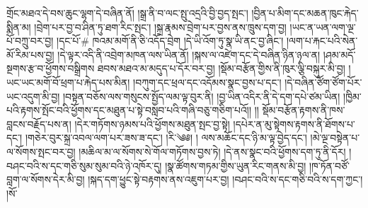  གྲོང་མཐའ་དེ་བས་ཆུང་ལྷག་དེ་བཞིན་ནོ། །སྒྲ་ནི་བ་ལང་སྤུ་འདྲའི་བྱི་བྱད་སྤང་། །བྱིན་པ་མིག་དང་མཆན་ཁུང་རྐེད་སྨིན་མ། །བྲེག་པར་བྱ་བ་ཤིན་ཏུ་ཐག་རིང་སྤང་། །སྐྲ་རྣམས་བྲེག་པར་བྱས་ནས་ཁྲུས་དག་བྱ། །ཡང་ན་ཡན་ལག་ལྔ་པོ་བཀྲུ་བར་བྱ། །དང་པོ་# ཁའམ་མགོ་ནི་ཅི་འདོད་བྲེག །དེ་ཡི་འོག་ཏུ་སྣ་ཡི་ནང་བྱ་ཞིང་། །ལག་པ་རྐང་པའི་སེན་མོ་རིམ་པས་བྱ། །དེ་ལྟར་འདི་ནི་འབྲེག་མཁན་ལས་ཡིན་ནོ། །སྐས་ལ་འཛེག་དང་དེ་བཞིན་ཉིན་ཉལ་ན། །ཤམ་མདོ་སྔགས་རྩ་བ་ཕྱོགས་བསྒྲིགས ཐབས་མཐའ་མ་མདུད་པ་དོར་བར་བྱ། །སྡོམ་བརྩོན་གྱིས་ནི་ཁུར་ལྕི་བསྐུར་མི་བྱ། །ཡང་ཡང་མགོ་བོ་ཕྲག་པ་རྐེད་པས་མིན། །བཀུག་དང་ཕྲལ་དང་འདོམས་སྣང་བྱས་པ་དང་། །དེ་བཞིན་ཙོག་ཙོག་པོར་ཡང་འདུག་མི་བྱ། །བསྟན་བཅོས་ལས་གསུངས་སྤྱོད་ལམ་ལྟ་བུར་ནི། །བྱ་ཡིན་འདིར་ནི་དེ་དག་དཔེ་ཙམ་ཡིན། །ཁྱིམ་པའི་རྟགས་སྤོང་བའི་ཕྱོགས་དང་མཐུན་པ་སྟེ་བསླབ་པའི་གཞི་བཅུ་གཅིག་པའོ།། །། སྡོམ་བརྩོན་རྟགས་ནི་ཁས་བླངས་བརྗོད་པས་ན། །དེར་གཏོགས་ཉམས་པའི་ཕྱོགས་མཐུན་སྤང་བྱ་སྟེ། །དཔེར་ན་མུ་སྟེགས་རྟགས་ནི་ཐོགས་པ་དང་། །གཅེར་བུར་སྐྲ་འབལ་ལག་པར་ཟས་ཟ་དང་། །རི་༄༅། ། ལས་མཆོང་དང་ཉི་མ་ལྟ་བྱེད་དང་། །མེ་ལྔ་བསྟེན་པ་ལ་སོགས་སྤང་བར་བྱ། །མཆིལ་མ་ལ་སོགས་སེ་གོལ་གཏོགས་བྱས་ཏེ། །དེ་ནས་སྣང་བའི་ཕྱོགས་དག་ཏུ་ནི་དོར། །བཤང་བའི་ས་དང་གཅི་སུམ་སུམ་བའི་ཉེ་འཁོར་དུ། །སྣ་ཚོགས་གཏམ་གྱིས་ཡུན་རིང་གནས་མི་བྱ། །ཁ་ཏོན་བཙོ་བླག་ལ་སོགས་དེར་མི་བྱ། །སྐད་དག་ཕྱུང་སྟེ་བརྟགས་ནས་འཇུག་པར་བྱ། །བཤང་བའི་ས་དང་གཅི་བའི་ས་དག་ཀྱང་། །སོ་%
